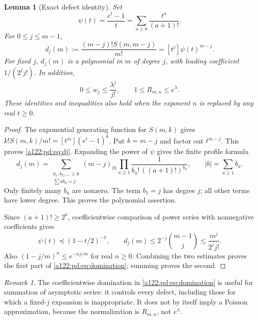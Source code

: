 \documentclass[11pt,letterpaper]{article}
\numberwithin{equation}{subsection}
\newtheorem{lemma}[theorem]{Lemma}
\theoremstyle{definition}
\theoremstyle{remark}
\newtheorem{remark}[theorem]{Remark}
\theoremstyle{plain}
\newcommand{\fall}[2]{(#1)_{\underline{#2}}}
\newcommand{\coeff}[2]{[#1^{#2}]}
\begin{document}
\begin{lemma}[Exact defect identity]\label{a122:pd:lem:defect}
Set
\begin{equation}\label{a122:pd:eq:h}
 \psi(t)=\frac{e^t-1}{t}=\sum_{a\ge0}\frac{t^a}{(a+1)!}.
\end{equation}
For $0\le j\le m-1$,
\begin{equation}\label{a122:pd:eq:dj}
 d_j(m):=\frac{(m-j)!S(m,m-j)}{m!}
 =\coeff{t}{j}\psi(t)^{m-j}.
\end{equation}
For fixed $j$, $d_j(m)$ is a polynomial in $m$ of degree $j$, with leading
coefficient $1/(2^j j!)$. In addition,
\begin{equation}\label{a122:pd:eq:domination}
 0\le w_j\le \frac{\lambda^j}{j!},\qquad
 1\le R_{m,n}\le e^\lambda.
\end{equation}
These identities and inequalities also hold when the exponent $n$ is
replaced by any real $t\ge0$.
\end{lemma}
\begin{proof}
The exponential generating function for $S(m,k)$ gives
$k!S(m,k)/m!=\coeff{t}{m}(e^t-1)^k$.
Put $k=m-j$ and factor out $t^{m-j}$. This proves \eqref{a122:pd:eq:dj}.
Expanding the power of $\psi$ gives the finite profile formula
\begin{equation}\label{a122:pd:eq:profile}
 d_j(m)=
 \sum_{\substack{b_1,b_2,\ldots\ge0\\\sum a b_a=j}}
 \fall{m-j}{|b|}\prod_{a\ge1}
 \frac1{b_a!\,((a+1)!)^{b_a}},\qquad |b|=\sum_{a\ge1}b_a.
\end{equation}
Only finitely many $b_a$ are nonzero. The term $b_1=j$ has degree $j$;
all other terms have lower degree. This proves the polynomial assertion.

Since $(a+1)!\ge2^a$, coefficientwise comparison of power series with
nonnegative coefficients gives
\[
 \psi(t)\preceq(1-t/2)^{-1},\qquad
 d_j(m)\le 2^{-j}\binom{m-1}{j}\le\frac{m^j}{2^j j!}.
\]
Also $(1-j/m)^n\le e^{-nj/m}$ for real $n\ge0$.
Combining the two estimates proves the first part of
\eqref{a122:pd:eq:domination}; summing proves the second.
\end{proof}

\begin{remark}
The coefficientwise domination in \eqref{a122:pd:eq:domination} is useful for
summation of asymptotic series: it controls every defect, including those
for which a fixed-$j$ expansion is inappropriate. It does not by itself
imply a Poisson approximation, because the normalization is $R_{m,n}$,
not $e^\lambda$.
\end{remark}
\end{document}
